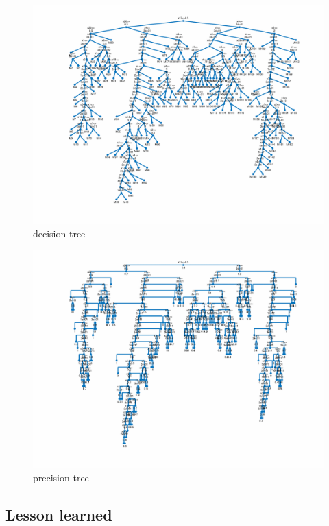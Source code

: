 \documentclass{article}
\begin{document}
\newpage
\vfill
\begin{figure}
	\includegraphics[width=\textwidth,height=\textheight,keepaspectratio]{decision_tree.png}
	\caption{decision tree}
\end{figure}	
\begin{figure}
	\centering
	\includegraphics[width=\textwidth,height=\textheight,keepaspectratio]{precision_tree.png}
	\caption{precision tree}
\end{figure}
\vfill
\clearpage


	
\subsection{Lesson learned}
\end{document}
